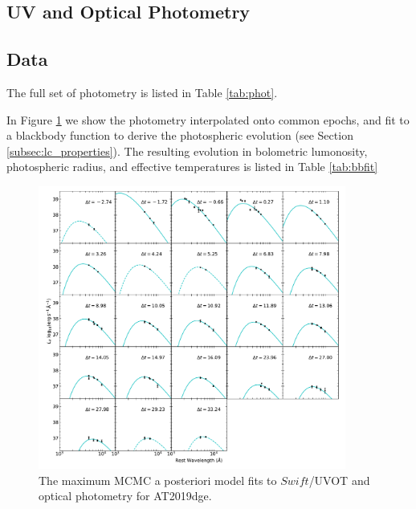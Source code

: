 \documentclass[twocolumn]{aastex63}
\begin{document}
\begin{CJK*}{UTF8}{gbsn}

\clearpage
\appendix

\section{UV and Optical Photometry} \label{sec:appphot}
\subsection{Data}\label{subsec:appphot_data}

The full set of photometry is listed in Table \ref{tab:phot}. 

In Figure \ref{fig:seds} we show the photometry interpolated onto common epochs, and fit to a 
blackbody function to derive the photospheric evolution (see Section \ref{subsec:lc_properties}). The 
resulting evolution in bolometric lumonosity, photospheric radius, and effective temperatures is listed 
in Table  \ref{tab:bbfit}
\begin{figure}
    \centering
    \includegraphics[width = 0.9\textwidth]{figures/seds.pdf}
    \caption{The maximum MCMC a posteriori model fits to $Swift$/UVOT and optical photometry for 
    AT2019dge.  \label{fig:seds}}
\end{figure}



\end{CJK*}
\end{document}
